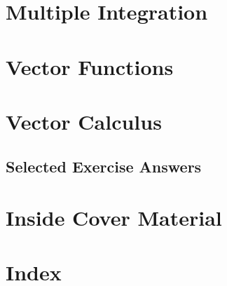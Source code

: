 \chapter{Multiple Integration}\label{chap:MultipleIntegration}
	
	
	
	
	
	
	

\chapter{Vector Functions}\label{chap:VectorFunctions}
	
	
	
        
	
	
\chapter{Vector Calculus}\label{chap:VectorCalculus}
	
	
        
        
	
	
	
	


\begin{enumialphparenastyle}
\chapter*{Selected Exercise Answers}
\begin{multicols}{2}
	
\end{multicols}	
\end{enumialphparenastyle}

\chapter*{Inside Cover Material}


\chapter*{Index}
\printindex